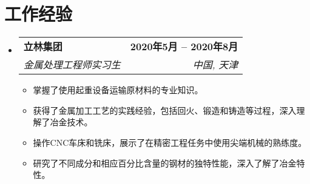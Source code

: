 \documentclass[letterpaper,11pt]{article}
\makeatletter
\newcommand{\resumeItem}[1]{
  \item\small{
    {#1 \vspace{-2pt}}
  }
}
\newcommand{\resumeSubheading}[4]{
  \vspace{-2pt}\item
    \begin{tabular*}{1.0\textwidth}[t]{l@{\extracolsep{\fill}}r}
      \textbf{#1} & \textbf{\small #2} \\
      \textit{\small#3} & \textit{\small #4} \\
    \end{tabular*}\vspace{-7pt}
}
\newcommand{\resumeSubHeadingListStart}{\begin{itemize}[leftmargin=0.0in, label={}]}
\newcommand{\resumeSubHeadingListEnd}{\end{itemize}}
\newcommand{\resumeItemListStart}{\begin{itemize}}
\newcommand{\resumeItemListEnd}{\end{itemize}\vspace{-5pt}}
\makeatother
\begin{document}
\section{工作经验}
  \resumeSubHeadingListStart
    \resumeSubheading
      {立林集团}{2020年5月 -- 2020年8月}
      {金属处理工程师实习生}{中国, 天津}
      \resumeItemListStart
        \resumeItem{掌握了使用起重设备运输原材料的专业知识。}
        \resumeItem{获得了金属加工工艺的实践经验，包括回火、锻造和铸造等过程，深入理解了冶金技术。}
        \resumeItem{操作CNC车床和铣床，展示了在精密工程任务中使用尖端机械的熟练度。}
        \resumeItem{研究了不同成分和相应百分比含量的钢材的独特性能，深入了解了冶金特性。}
      \resumeItemListEnd
  \resumeSubHeadingListEnd
\vspace{-15pt}

\end{document}
